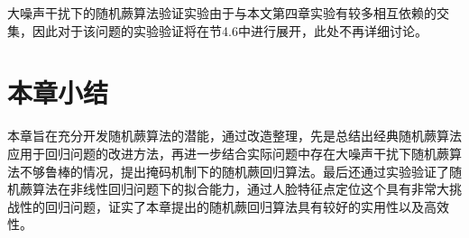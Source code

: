 
大噪声干扰下的随机蕨算法验证实验由于与本文第四章实验有较多相互依赖的交集，因此对于该问题的实验验证将在节4.6中进行展开，此处不再详细讨论。


\section{本章小结}
本章旨在充分开发随机蕨算法的潜能，通过改造整理，先是总结出经典随机蕨算法应用于回归问题的改进方法，再进一步结合实际问题中存在大噪声干扰下随机蕨算法不够鲁棒的情况，提出掩码机制下的随机蕨回归算法。最后还通过实验验证了随机蕨算法在非线性回归问题下的拟合能力，通过人脸特征点定位这个具有非常大挑战性的回归问题，证实了本章提出的随机蕨回归算法具有较好的实用性以及高效性。























